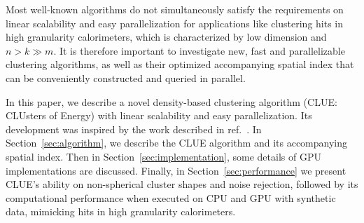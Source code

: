 Most well-known algorithms do not simultaneously satisfy the requirements on linear scalability and easy parallelization for applications like clustering hits in high granularity calorimeters, which is characterized by low dimension and $n > k \gg m$. It is therefore important to investigate new, fast and parallelizable clustering algorithms, as well as their optimized accompanying spatial index that can be conveniently constructed and queried in parallel.

In this paper, we describe a novel density-based clustering algorithm (CLUE: CLUsters of Energy) with linear scalability and easy parallelization. Its development was inspired by the work described in ref.~\cite{rodriguez2014clustering}. In Section~\ref{sec:algorithm}, we describe the CLUE algorithm and its accompanying spatial index. Then in Section~\ref{sec:implementation}, some details of GPU implementations are discussed. Finally, in Section~\ref{sec:performance} we present CLUE's ability on non-spherical cluster shapes and noise rejection, followed by its computational performance when executed on CPU and GPU with synthetic data, mimicking hits in high granularity calorimeters.





